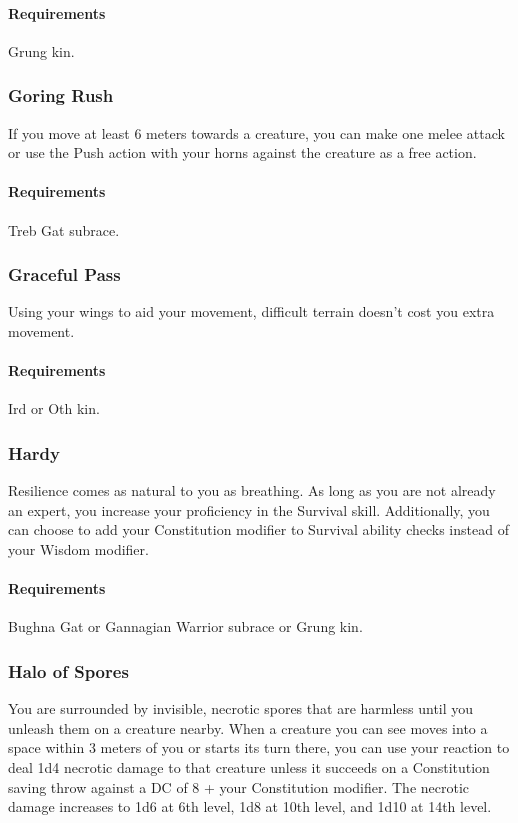     \paragraph{Requirements} Grung kin.
\subsubsection{Goring Rush} \label{feat::goringrush}
    If you move at least 6 meters towards a creature, you can make one melee attack or use the Push action with your horns against the creature as a free action.
    \paragraph{Requirements} Treb Gat subrace.
\subsubsection{Graceful Pass} \label{feat::gracefulpass}
    Using your wings to aid your movement, difficult terrain doesn't cost you extra movement.
    \paragraph{Requirements} Ird or Oth kin.
\subsubsection{Hardy} \label{feat::hardy}
    Resilience comes as natural to you as breathing.
    As long as you are not already an expert, you increase your proficiency in the Survival skill.
    Additionally, you can choose to add your Constitution modifier to Survival ability checks instead of your Wisdom modifier.
    \paragraph{Requirements} Bughna Gat or Gannagian Warrior subrace or Grung kin.
\subsubsection{Halo of Spores} \label{feat::haloofspores}
    You are surrounded by invisible, necrotic spores that are harmless until you unleash them on a creature nearby.
    When a creature you can see moves into a space within 3 meters of you or starts its turn there, you can use your reaction to deal 1d4 necrotic damage to that creature unless it succeeds on a Constitution saving throw against a DC of 8 + your Constitution modifier.
    The necrotic damage increases to 1d6 at 6th level, 1d8 at 10th level, and 1d10 at 14th level.
